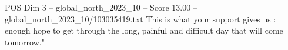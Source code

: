 \begin{textsample}{POS Dim 3 – global\_north\_2023\_10 – Score 13.00 – global\_north\_2023\_10/103035419.txt}
This is what your support gives us : enough hope to get through the long, painful and difficult day that will come tomorrow."

\end{textsample}
